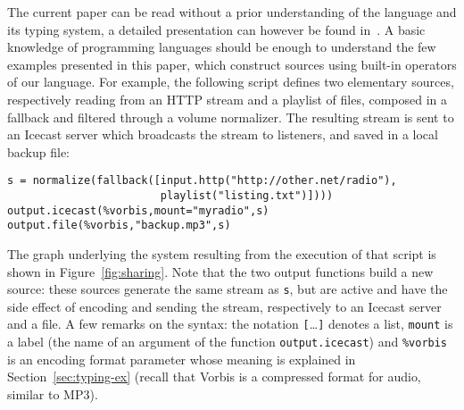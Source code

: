 \documentclass{llncs}
\newcommand{\TODO}[1]{}%
\begin{document}
The current paper can be read without a prior understanding of the language and
its typing system, a detailed presentation can however be found
in~\cite{baelde-mimram:webradio-lambda}.
A basic knowledge of programming languages should be enough to understand
the few examples presented in this paper,
which construct sources using built-in operators of our language.
For example, the following script defines two elementary sources, respectively 
reading from an HTTP stream and a playlist of files, composed in a fallback
and filtered through a volume normalizer.
The resulting stream is sent to an Icecast server which 
broadcasts the stream to listeners,
and saved in a local backup file:
\begin{verbatim}
s = normalize(fallback([input.http("http://other.net/radio"),
                        playlist("listing.txt")])))
output.icecast(%vorbis,mount="myradio",s)
output.file(%vorbis,"backup.mp3",s)
\end{verbatim}
The graph underlying the system resulting from the execution of that script is
shown in Figure~\ref{fig:sharing}.
Note that the two output functions build a new source:
these sources generate the same stream as \verb.s.,
but are active and have the side effect of encoding and sending
the stream, respectively to an Icecast server and a file.
A few remarks on the syntax: the notation
\hbox{\texttt{[}\ldots\texttt{]}} denotes a list, \texttt{mount}
is a label (the name of an argument of the function \texttt{output.icecast}) and
\texttt{\%vorbis} is an encoding format parameter whose meaning is explained in
Section~\ref{sec:typing-ex}
(recall that Vorbis is a compressed format for audio, similar to MP3).

% 
% 
\end{document}
